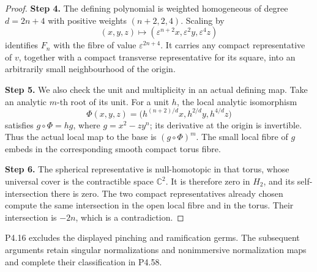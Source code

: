 \begin{proof}
\noindent\textbf{Step 4.} The defining polynomial is weighted homogeneous of degree
$d=2n+4$ with positive weights $(n+2,2,4)$. Scaling by
\[
 (x,y,z)\longmapsto
 (\varepsilon^{n+2}x,\varepsilon^2y,\varepsilon^4z)
\]
identifies $F_n$ with the fibre of value $\varepsilon^{2n+4}$.
It carries any compact representative of $v$, together with a
compact transverse representative for its square, into an
arbitrarily small neighbourhood of the origin.

\noindent\textbf{Step 5.} We also check the unit and multiplicity in an actual defining
map. Take an analytic $m$-th root of its unit. For a unit $h$,
the local analytic isomorphism
\[
 \Phi(x,y,z)=
 \bigl(h^{(n+2)/d}x,h^{2/d}y,h^{4/d}z\bigr)
\]
satisfies $g\circ\Phi=hg$, where $g=x^2-zy^n$; its derivative
at the origin is invertible. Thus the actual local map to the
base is $(g\circ\Phi)^m$. The small local fibre of $g$ embeds
in the corresponding smooth compact torus fibre.

\noindent\textbf{Step 6.} The spherical representative is null-homotopic in that torus,
whose universal cover is the contractible space $\mathbb C^2$.
It is therefore zero in $H_2$, and its self-intersection there
is zero. The two compact representatives already chosen compute
the same intersection in the open local fibre and in the torus.
Their intersection is $-2n$, which is a contradiction.
\end{proof}

P4.16 excludes the displayed pinching and ramification germs.
The subsequent arguments retain singular normalizations and
nonimmersive normalization maps and complete their classification
in P4.58.

